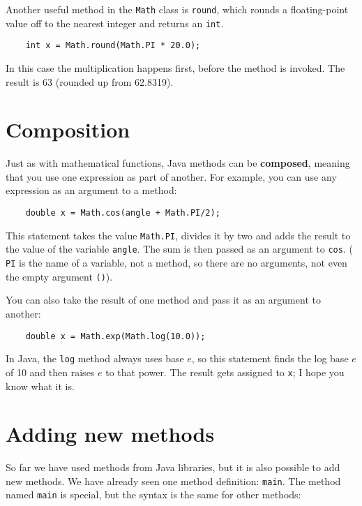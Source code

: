 \documentclass[12pt]{book}
\theoremstyle{definition}
\begin{document}
Another useful method in the {\tt Math} class is {\tt round},
which rounds a floating-point value off to the nearest integer
and returns an {\tt int}.

\begin{lstlisting}
    int x = Math.round(Math.PI * 20.0);
\end{lstlisting}
%
In this case the multiplication happens first, before the
method is invoked.  The result is 63 (rounded up from 62.8319).


\section {Composition}
\label{composition}

Just as with mathematical functions, Java methods can be {\bf
composed}, meaning that you use one expression as part of another.
For example, you can use any expression as an argument to a method:

\begin{lstlisting}
    double x = Math.cos(angle + Math.PI/2);
\end{lstlisting}
%
This statement takes the value {\tt Math.PI}, divides it by two and
adds the result to the value of the variable {\tt angle}.  The sum is
then passed as an argument to {\tt cos}. ({\tt
PI} is the name of a variable, not a method, so there are no
arguments, not even the empty argument {\tt()}).

You can also take the result of one method and pass it as
an argument to another:

\begin{lstlisting}
    double x = Math.exp(Math.log(10.0));
\end{lstlisting}
%
In Java, the {\tt log} method always uses base $e$, so this
statement finds the log base $e$ of 10 and then raises $e$ to that
power.  The result gets assigned to {\tt x}; I hope you know what it
is.

\section{Adding new methods}
\label{adding_methods}

So far we have used methods from Java libraries,
but it is also possible to add new methods.  We have already
seen one method definition: {\tt main}.  The method named {\tt main}
is special, but the syntax is the same for other methods:
\end{document}
